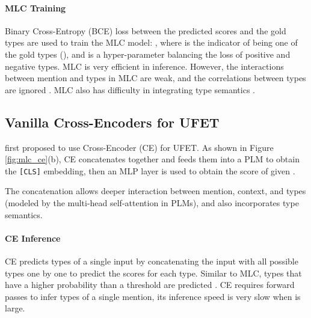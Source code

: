 \documentclass[11pt]{article}
\begin{document}
\paragraph{MLC Training} Binary Cross-Entropy (BCE) loss between the predicted scores and the gold types are used to train the MLC model: , where  is the indicator of  being one of the gold types (), and  is a hyper-parameter balancing the loss of positive and negative types. MLC is very efficient in inference. However, the interactions between mention and types in MLC are weak, and the correlations between types are ignored \cite{box4types,xiong-etal-2019-imposing,npcrf}. MLC also has difficulty in integrating type semantics \cite{lite}.

\subsection{Vanilla Cross-Encoders for UFET}
\label{sec:vanilla_ce}
\citet{lite} first proposed to use Cross-Encoder (CE) for UFET. As shown in Figure \ref{fig:mlc_ce}(b), CE concatenates  together and feeds them into a PLM to obtain the {\tt [CLS]} embedding, then an MLP layer is used to obtain the score of  given .

The concatenation allows deeper interaction between mention, context, and types (modeled by the multi-head self-attention in PLMs), and also incorporates type semantics.
\paragraph{CE Inference} CE predicts types of a single input  by concatenating the input with all possible types  one by one to predict the scores  for each type. Similar to MLC, types that have a higher probability than a threshold are predicted . CE requires  forward passes to infer types of a single mention, its inference speed is very slow when  is large.
\end{document}
